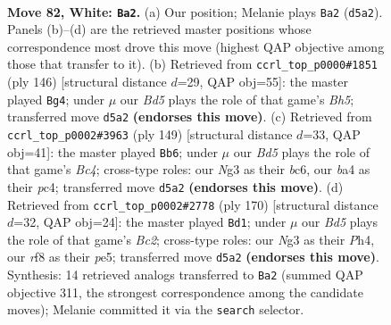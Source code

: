 \documentclass[11pt]{article}
\begin{document}
\clearpage

\begin{figure}[p]\centering
\begin{subfigure}{0.46\textwidth}\centering
\resizebox{\linewidth}{!}{%
\newchessgame
\chessboard[
  setfen={5r2/5p2/n5p1/3BP2p/b4Pp1/2k3N1/7P/6K1 w - - 22 82},
  showmover=false,
  pgfstyle=straightmove, color=movearrow, markmove={d5-a2}
]}
\caption{}
\end{subfigure}\hfill
\begin{subfigure}{0.46\textwidth}\centering
\resizebox{\linewidth}{!}{%
\newchessgame
\chessboard[
  setfen={8/4kp2/4p3/3p2PB/3P1N2/4P3/5K2/r7 w - - 5 74},
  showmover=false,
  pgfstyle=straightmove, color=movearrow, markmove={h5-g4}
]}
\caption{}
\end{subfigure}
\\[4pt]
\begin{subfigure}{0.46\textwidth}\centering
\resizebox{\linewidth}{!}{%
\newchessgame
\chessboard[
  setfen={8/8/2B3k1/p1b2p2/P1P1p1p1/4P1P1/5P2/6K1 b - - 21 75},
  showmover=false,
  pgfstyle=straightmove, color=movearrow, markmove={c5-b6}
]}
\caption{}
\end{subfigure}\hfill
\begin{subfigure}{0.46\textwidth}\centering
\resizebox{\linewidth}{!}{%
\newchessgame
\chessboard[
  setfen={8/5k2/6p1/2p1pp1p/2P1p2P/6P1/2B3K1/8 w - - 54 86},
  showmover=false,
  pgfstyle=straightmove, color=movearrow, markmove={c2-d1}
]}
\caption{}
\end{subfigure}
\caption{\textbf{Move 82, White: \texttt{Ba2}.} (a) Our position; Melanie plays \texttt{Ba2} (\texttt{d5a2}). Panels (b)--(d) are the retrieved master positions whose correspondence most drove this move (highest QAP objective among those that transfer to it). (b) Retrieved from \texttt{ccrl\_top\_p0000\#1851} (ply 146) [structural distance $d$=29, QAP obj=55]: the master played \texttt{Bg4}; under $\mu$ our \emph{Bd5} plays the role of that game's \emph{Bh5}; transferred move \texttt{d5a2} \textbf{(endorses this move)}. (c) Retrieved from \texttt{ccrl\_top\_p0002\#3963} (ply 149) [structural distance $d$=33, QAP obj=41]: the master played \texttt{Bb6}; under $\mu$ our \emph{Bd5} plays the role of that game's \emph{Bc4}; cross-type roles: our \emph{N}g3 as their \emph{b}c6, our \emph{b}a4 as their \emph{p}c4; transferred move \texttt{d5a2} \textbf{(endorses this move)}. (d) Retrieved from \texttt{ccrl\_top\_p0002\#2778} (ply 170) [structural distance $d$=32, QAP obj=24]: the master played \texttt{Bd1}; under $\mu$ our \emph{Bd5} plays the role of that game's \emph{Bc2}; cross-type roles: our \emph{N}g3 as their \emph{P}h4, our \emph{r}f8 as their \emph{p}e5; transferred move \texttt{d5a2} \textbf{(endorses this move)}. Synthesis: 14 retrieved analogs transferred to \texttt{Ba2} (summed QAP objective 311, the strongest correspondence among the candidate moves); Melanie committed it via the \texttt{search} selector.}
\label{fig:thought-m162}
\end{figure}
\end{document}
